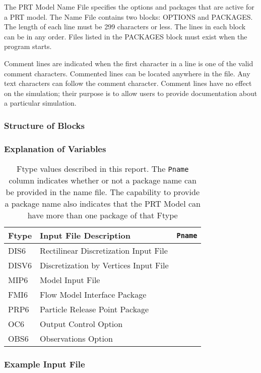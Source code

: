 The PRT Model Name File specifies the options and packages that are active for a PRT model.  The Name File contains two blocks: OPTIONS  and PACKAGES. The length of each line must be 299 characters or less. The lines in each block can be in any order.  Files listed in the PACKAGES block must exist when the program starts. 

Comment lines are indicated when the first character in a line is one of the valid comment characters.  Commented lines can be located anywhere in the file. Any text characters can follow the comment character. Comment lines have no effect on the simulation; their purpose is to allow users to provide documentation about a particular simulation. 

\vspace{5mm}
\subsubsection{Structure of Blocks}



\vspace{5mm}
\subsubsection{Explanation of Variables}
\begin{description}

\end{description}

\begin{table}[H]
\caption{Ftype values described in this report.  The \texttt{Pname} column indicates whether or not a package name can be provided in the name file.  The capability to provide a package name also indicates that the PRT Model can have more than one package of that Ftype}
\small
\begin{center}
\begin{tabular*}{\columnwidth}{l l l}
\hline
\hline
Ftype & Input File Description & \texttt{Pname}\\
\hline
DIS6 & Rectilinear Discretization Input File \\
DISV6 & Discretization by Vertices Input File \\
MIP6 & Model Input File \\
FMI6 & Flow Model Interface Package &  \\ 
PRP6 & Particle Release Point Package \\
OC6 & Output Control Option \\
OBS6 & Observations Option \\
\hline 
\end{tabular*}
\label{table:ftypeprt}
\end{center}
\normalsize
\end{table}

\vspace{5mm}
\subsubsection{Example Input File}


